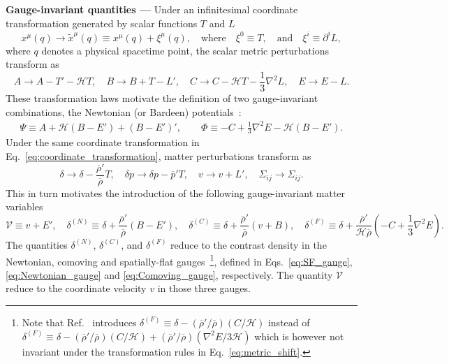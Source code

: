 \documentclass[twocolumn,superscriptaddress,aps,preprintnumbers,amsmath,amssymb,prl,footinbib]{revtex4-2}
\begin{document}
\textbf{Gauge-invariant quantities ---}
Under an infinitesimal coordinate transformation generated by scalar functions $T$ and $L$
\begin{equation}
\label{eq:coordinate_transformation}
x^\mu(q)\rightarrow \tilde{x}^\mu(q)\equiv x^\mu(q)+\xi^\mu(q),\quad \textrm{where}\quad \xi^0\equiv T,\quad\textrm{and}\quad \xi^i\equiv \partial^i L,
\end{equation}
where $q$ denotes a physical spacetime point, the scalar metric perturbations transform as~\cite{Baumann:2022mni}
\begin{equation}
\label{eq:metric_shift}
    A\rightarrow A-T'-\mathcal{H}T,\quad B\rightarrow B+T-L',\quad C\rightarrow C-\mathcal{H}T-\frac{1}{3}\nabla^2 L,\quad E\rightarrow E-L.
\end{equation}
These transformation laws motivate the definition of two gauge-invariant combinations, the Newtonian (or Bardeen) potentials~\cite{Bardeen:1980kt, Baumann:2022mni}:
\begin{align}
\label{eq:Bardeen_Potentials}
    \Psi \equiv A + \mathcal{H}(B - E') + (B - E')', \qquad \Phi \equiv -C + \frac{1}{3}\nabla^2 E - \mathcal{H}(B - E').
\end{align}
Under the same coordinate transformation in Eq.~\eqref{eq:coordinate_transformation}, matter perturbations transform as~\cite{Baumann:2022mni}
\begin{equation}
\label{eq:matter_shift}
    \delta \rightarrow \delta-\frac{\overline{\rho}'}{\overline{\rho}} T,\quad \delta p\rightarrow \delta p-\overline{p}'T,\quad v\to v+L',\quad \Sigma_{i j}\rightarrow \Sigma_{ij}.
\end{equation}
This in turn motivates the introduction of the following gauge-invariant matter variables~\cite{Peter:2013avv}
\begin{equation}
\label{eq:density_constrast_defs}
   \mathcal{V} \equiv v + E',\quad \delta^{(N)} \equiv \delta + \frac{\overline{\rho}'}{\overline{\rho}}(B - E'),\quad \delta^{(C)}\equiv \delta  + \frac{\overline{\rho}'}{\overline{\rho}}(v+B) ,\quad \delta^{(F)}\equiv \delta+\frac{\overline{\rho}'}{\mathcal{H}\overline{\rho}}\left( -C+\frac{1}{3}\nabla^2E\right).
\end{equation}
The quantities $ \delta^{(N)}$, $ \delta^{(C)}$, and  $\delta^{(F)}$ reduce to the contrast density in the Newtonian, comoving and spatially-flat gauges~\footnote{Note that Ref.~\cite{Peter:2013avv} introduces $\delta^{(F)}\equiv \delta-(\overline{\rho}'/\overline{\rho})(C/\mathcal{H})$ instead of $\delta^{(F)}\equiv \delta-(\overline{\rho}'/\overline{\rho})(C/\mathcal{H})+(\overline{\rho}'/\overline{\rho})(\nabla^2E/3\mathcal{H})$ which is however not invariant under the transformation rules in Eq.~\eqref{eq:metric_shift}.}, defined in Eqs.~\eqref{eq:SF_gauge}, \eqref{eq:Newtonian_gauge} and \eqref{eq:Comoving_gauge}, respectively. The quantity $ \mathcal{V}$ reduce to the coordinate velocity $v$ in those three gauges.
\end{document}
